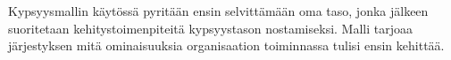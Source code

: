 \documentclass[finnish,12pt,a4paper,pdftex]{article}
\begin{document}
Kypsyysmallin käytössä pyritään ensin selvittämään oma taso, jonka jälkeen suoritetaan kehitystoimenpiteitä kypsyystason nostamiseksi. Malli tarjoaa järjestyksen mitä ominaisuuksia organisaation toiminnassa tulisi ensin kehittää. \citep{okaytannot} \\




\end{document}
